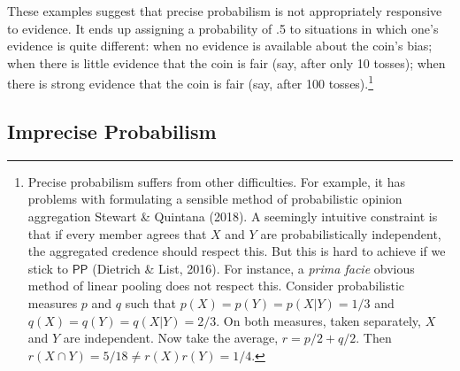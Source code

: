 \documentclass[
  10pt,
  dvipsnames,enabledeprecatedfontcommands]{scrartcl}
\newcommand{\s}[1]{\mbox{$\mathsf{#1}$}}
\begin{document}
These examples suggest that precise probabilism is not appropriately
responsive to evidence. It ends up assigning a probability of .5 to
situations in which one's evidence is quite different: when no evidence
is available about the coin's bias; when there is little evidence that
the coin is fair (say, after only 10 tosses); when there is strong
evidence that the coin is fair (say, after 100 tosses).\footnote{Precise
  probabilism suffers from other difficulties. For example, it has
  problems with formulating a sensible method of probabilistic opinion
  aggregation Stewart \& Quintana (2018). A seemingly intuitive
  constraint is that if every member agrees that \(X\) and \(Y\) are
  probabilistically independent, the aggregated credence should respect
  this. But this is hard to achieve if we stick to \s{PP} (Dietrich \&
  List, 2016). For instance, a \emph{prima facie} obvious method of
  linear pooling does not respect this. Consider probabilistic measures
  \(p\) and \(q\) such that \(p(X) = p(Y) = p(X\vert Y) = 1/3\) and
  \(q(X) = q(Y) = q(X\vert Y) = 2/3\). On both measures, taken
  separately, \(X\) and \(Y\) are independent. Now take the average,
  \(r=p/2+q/2\). Then \(r(X\cap Y) = 5/18 \neq r(X)r(Y)=1/4\).}

\hypertarget{imprecise-probabilism}{%
\subsection{Imprecise Probabilism}\label{imprecise-probabilism}}
\end{document}
